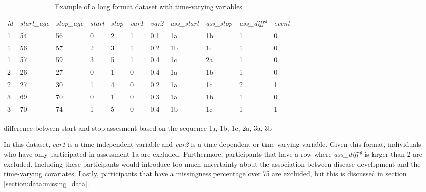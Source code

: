\begin{table} [H]
    \centering
    \caption{Example of a long format dataset with time-varying variables}
    \begin{tabular}{lllllllllll}
\hline
\textit{id} & \textit{start\_age} & \textit{stop\_age} & \textit{start} & \textit{stop} & \textit{var1} & \textit{var2} & \textit{ass\_start} & \textit{ass\_stop} & \textit{ass\_diff*} & \textit{event} \\ 
1  & 54         & 56        & 0     & 2    & 1    & 0.1  & 1a                & 1b               & 1                & 0     \\ 
1  & 56         & 57        & 2     & 3    & 1    & 0.2  & 1b                & 1c               & 1                & 0     \\ 
1  & 57         & 59        & 3     & 5    & 1    & 0.4  & 1c                & 2a               & 1                & 0     \\ 
2  & 26         & 27        & 0     & 1    & 0    & 0.4  & 1a                & 1b               & 1                & 0     \\ 
2  & 27         & 30        & 1     & 4    & 0    & 0.2  & 1a                & 1c               & 2                & 1     \\ 
3  & 69         & 70        & 0     & 1    & 0    & 0.3  & 1a                & 1b               & 1                & 0     \\ 
3  & 70         & 74        & 1     & 5    & 0    & 0.4  & 1b                & 1c               & 1                & 1     \\ \hline
    \end{tabular}
    \begin{tablenotes}
        \small
        \item* difference between start and stop assesment based on the sequence 1a, 1b, 1c, 2a, 3a, 3b
      \end{tablenotes}
    \label{table:data:example_long_format}
\end{table}

In this dataset, \textit{var1} is a time-independent variable and \textit{var2} is a time-dependent or time-varying variable. Given this format, individuals who have only participated in assessment 1a are excluded. Furthermore, participants that have a row where \textit{ass\_diff*} is larger than 2 are excluded. Including these participants would introduce too much uncertainty about the association between disease development and the time-varying covariates. Lastly, participants that have a missingness percentage over 75 are excluded, but this is discussed in section \ref{section:data:missing_data}. 

